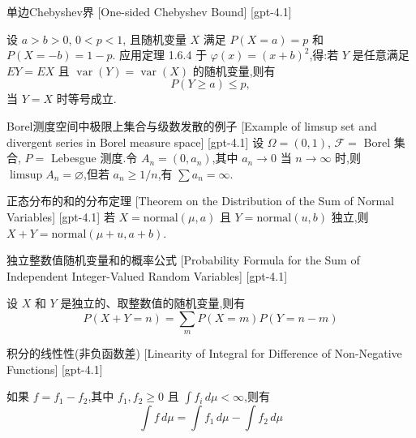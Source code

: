 \documentclass[UTF8]{ctexart}
\begin{document}
    
    
    \begin{thm}
        {单边Chebyshev界}
        [One-sided Chebyshev Bound]
        [gpt-4.1]
        
设 $a > b > 0$, $0 < p < 1$, 且随机变量 $X$ 满足 $P(X = a) = p$ 和 $P(X = -b) = 1 - p$.
应用定理 1.6.4 于 $\varphi(x) = (x + b)^2$,得:若 $Y$ 是任意满足 $E Y = E X$ 且 $\operatorname{var}(Y) = \operatorname{var}(X)$ 的随机变量,则有
\[
P(Y \geq a) \leq p,
\]
当 $Y = X$ 时等号成立.

    \end{thm}
    
    
    
    \begin{xmp}
        {Borel测度空间中极限上集合与级数发散的例子}
        [Example of limsup set and divergent series in Borel measure space]
        [gpt-4.1]
        设 $\Omega = (0, 1)$, ${\mathcal{F}} =$ Borel 集合, $P =$ Lebesgue 测度.令 $A_{n} = (0, a_{n})$,其中 $a_{n} \to 0$ 当 $n \to \infty$ 时,则 $\limsup A_{n} = \varnothing$,但若 $a_{n} \geq 1/n$,有 $\textstyle\sum a_{n} = \infty$.
    \end{xmp}
    
    
    
    \begin{thm}
        {正态分布的和的分布定理}
        [Theorem on the Distribution of the Sum of Normal Variables]
        [gpt-4.1]
        若 $X = \mathrm{normal}(\mu, a)$ 且 $Y = \mathrm{normal}(
u, b)$ 独立,则 $X + Y = \mathrm{normal}(\mu + 
u, a + b)$.
    \end{thm}
    
    
    
    \begin{thm}
        {独立整数值随机变量和的概率公式}
        [Probability Formula for the Sum of Independent Integer-Valued Random Variables]
        [gpt-4.1]
        
设 $X$ 和 $Y$ 是独立的、取整数值的随机变量,则有
\[
P(X+Y=n) = \sum_{m} P(X=m) P(Y=n-m)
\]

    \end{thm}
    
    
    
    \begin{lma}
        {积分的线性性(非负函数差)}
        [Linearity of Integral for Difference of Non-Negative Functions]
        [gpt-4.1]
        
如果 $f = f_1 - f_2$,其中 $f_1, f_2 \geq 0$ 且 $\int f_i \, d\mu < \infty$,则有
\[
\int f \, d\mu = \int f_1 \, d\mu - \int f_2 \, d\mu
\]

    \end{lma}
    
\end{document}
